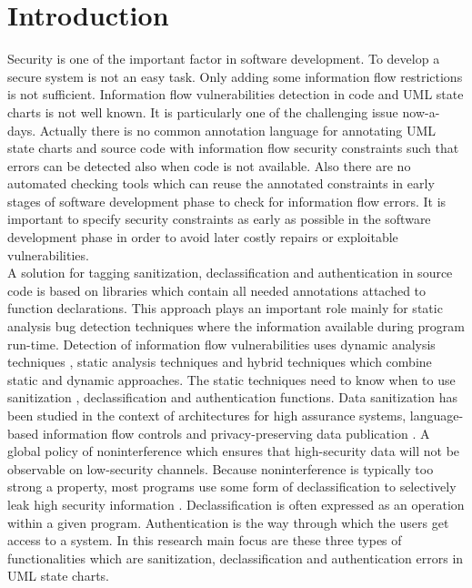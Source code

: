 \chapter{Introduction}
\label{chapter:Introduction}
Security is one of the important factor in software development. To develop a secure system is not an easy task. Only adding some information flow restrictions is not sufficient. Information flow vulnerabilities detection in code and UML state charts is not well known. It is particularly one of the challenging issue now-a-days. Actually there is no common annotation language for annotating UML state charts and source code with
information flow security constraints such that errors can be detected also when code is not available. Also there are
no automated checking tools which can reuse the annotated constraints in early stages of software development phase to check
for information flow errors. It is important to specify security constraints as early as possible in the software
development phase in order to avoid later costly repairs or exploitable vulnerabilities.\\

A solution for tagging sanitization, declassification and authentication in source code is based on libraries which contain all needed annotations attached to function declarations. This approach plays an important role mainly for static analysis bug detection techniques where the information available during program run-time. Detection of information flow vulnerabilities uses dynamic analysis techniques , static analysis techniques and hybrid techniques which combine static and dynamic approaches. The static techniques need to know when to use  sanitization , declassification and authentication functions. Data sanitization has been studied in the context of architectures for high assurance systems, language-based information flow controls and privacy-preserving data publication \cite{ref_1_gehani2011f}. A global policy of noninterference which ensures that high-security data will not be observable on low-security channels. Because noninterference is typically
too strong a property, most programs use some form of declassification to selectively leak high security  information \cite{ref_2_hicks2006trusted}. Declassification is often expressed as an operation within a given
program. Authentication is the way through which the users get access to a system. In this research main focus are these three types of functionalities which are sanitization, declassification and authentication errors in UML state charts. \\

